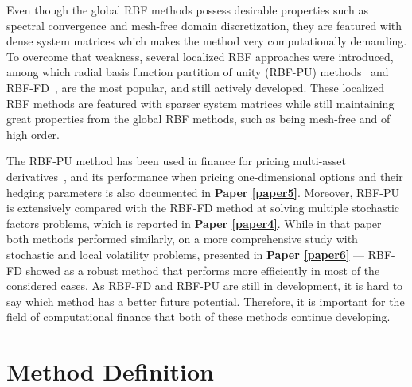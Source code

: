 \documentclass{UUThesisTemplate}
\begin{document}
\par
Even though the global RBF methods possess desirable properties such as spectral convergence and mesh-free domain discretization, they are featured with dense system matrices which makes the method very computationally demanding. To overcome that weakness, several localized RBF approaches were introduced, among which radial basis function partition of unity (RBF-PU) methods~\cite{wendland2002fast} and RBF-FD~\cite{tolstykh2000using, wright2006scattered}, are the most popular, and still actively developed. These localized RBF methods are featured with sparser system matrices while still maintaining great properties from the global RBF methods, such as being mesh-free and of high order.

\par
The RBF-PU method has been used in finance for pricing multi-asset derivatives~\cite{safdari2015radial, shcherbakov2016radialvanilla, shcherbakov2016radial}, and its performance when pricing one-dimensional options and their hedging parameters is also documented in \textbf{Paper \ref{paper5}}. Moreover, RBF-PU is extensively compared with the RBF-FD method at solving multiple stochastic factors problems, which is reported in \textbf{Paper \ref{paper4}}. While in that paper both methods performed similarly, on a more comprehensive study with stochastic and local volatility problems, presented in \textbf{Paper \ref{paper6}} --- RBF-FD showed as a robust method that performs more efficiently in most of the considered cases. As RBF-FD and RBF-PU are still in development, it is hard to say which method has a better future potential. Therefore, it is important for the field of computational finance that both of these methods continue developing.
%





%
\section{Method Definition}
\end{document}
